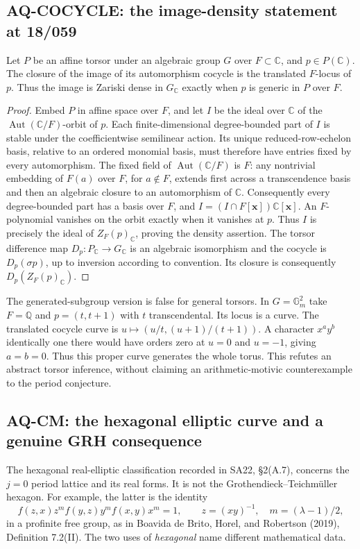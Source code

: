 \subsection{AQ-COCYCLE: the image-density statement at 18/059}
Let $P$ be an affine torsor under an algebraic group $G$
over $F\subset\mathbb C$, and $p\in P(\mathbb C)$.
The closure of the image of its automorphism cocycle
is the translated $F$-locus of $p$. Thus the image is
Zariski dense in $G_{\mathbb C}$ exactly when $p$ is
generic in $P$ over $F$.
\begin{proof}
Embed $P$ in affine space over $F$, and let $I$ be the
ideal over $\mathbb C$ of the
$\operatorname{Aut}(\mathbb C/F)$-orbit of $p$.
Each finite-dimensional degree-bounded part of $I$
is stable under the coefficientwise semilinear action.
Its unique reduced-row-echelon basis, relative to an
ordered monomial basis, must therefore have entries
fixed by every automorphism. The fixed field of
$\operatorname{Aut}(\mathbb C/F)$ is $F$: any nontrivial
embedding of $F(a)$ over $F$, for $a\notin F$, extends
first across a transcendence basis and then an algebraic
closure to an automorphism of $\mathbb C$.
Consequently every degree-bounded part has a basis
over $F$, and $I=(I\cap F[\mathbf x])\mathbb C[\mathbf x]$.
An $F$-polynomial vanishes on the orbit exactly when
it vanishes at $p$. Thus $I$ is precisely the ideal of
$Z_F(p)_{\mathbb C}$, proving the density assertion.
The torsor difference map $D_p:P_{\mathbb C}\to G_{\mathbb C}$
is an algebraic isomorphism and the cocycle is
$D_p(\sigma p)$, up to inversion according to convention.
Its closure is consequently $D_p(Z_F(p)_{\mathbb C})$.
\end{proof}
The generated-subgroup version is false for general
torsors. In $G=\mathbb G_m^2$ take $F=\mathbb Q$ and
$p=(t,t+1)$ with $t$ transcendental. Its locus is a curve.
The translated cocycle curve is
$u\mapsto(u/t,(u+1)/(t+1))$.
A character $x^a y^b$ identically one there would have
orders zero at $u=0$ and $u=-1$, giving $a=b=0$.
Thus this proper curve generates the whole torus.
This refutes an abstract torsor inference, without
claiming an arithmetic-motivic counterexample to the
period conjecture.

\subsection{AQ-CM: the hexagonal elliptic curve and a genuine GRH consequence}
The hexagonal real-elliptic classification recorded in SA22,
\S2(A.7), concerns the $j=0$ period lattice and its real
forms. It is not the Grothendieck--Teichm\"uller hexagon.
For example, the latter is the identity
\[
 f(z,x)z^m f(y,z)y^m f(x,y)x^m=1,\qquad
 z=(xy)^{-1},\quad m=(\lambda-1)/2,
\]
in a profinite free group, as in Boavida de Brito, Horel,
and Robertson (2019), Definition 7.2(II). The two uses of
\emph{hexagonal} name different mathematical data.

